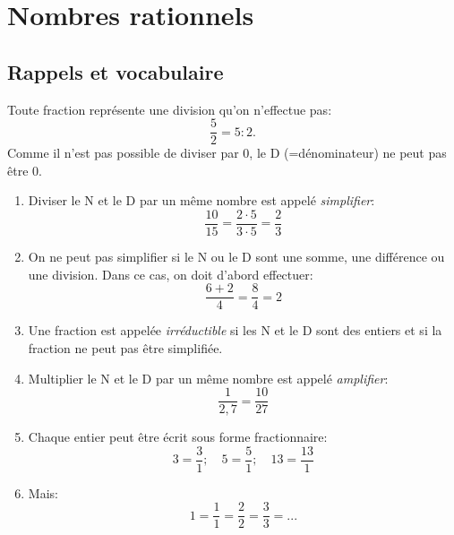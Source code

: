 \chapter{Nombres rationnels}

\section{Rappels et vocabulaire}
Toute fraction représente une division qu'on n'effectue pas:
$$ \dfrac{5}{2} = 5:2. $$
Comme il n'est pas possible de diviser par 0, le D (=dénominateur) ne peut pas être 0.
\\

\begin{enumerate}[label=$\triangleright$]
	\item Diviser le N et le D par un même nombre est appelé \og\emph{simplifier}\fg{}:
				$$ \dfrac{10}{15} = \dfrac{2 \cdot 5}{3 \cdot 5} = \dfrac{2}{3} $$
  \item On ne peut pas simplifier si le N ou le D sont une somme, une différence ou une division. Dans ce cas, on doit d'abord effectuer:
    		$$ \frac{6+2}{4} = \frac{8}{4}=2 $$
	\item Une fraction est appelée \og\emph{irréductible}\fg{} si les N et le D sont des entiers et si la fraction ne peut pas être simplifiée.
	\item Multiplier le N et le D par un même nombre est appelé \og\emph{amplifier}\fg{}:
				$$ \dfrac{1}{2,7} = \dfrac{10}{27} $$
	\item Chaque entier peut être écrit sous forme fractionnaire:
				$$ 3=\frac{3}{1};\quad 5 = \dfrac{5}{1};\quad 13 = \dfrac{13}{1} $$
	\item Mais:
				$$ 1=\frac{1}{1} = \dfrac{2}{2} = \dfrac{3}{3} = ... $$
\end{enumerate}



